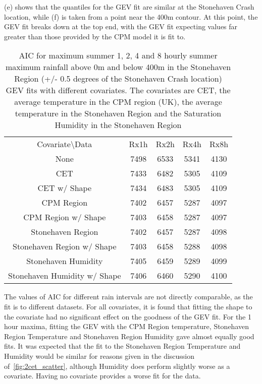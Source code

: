 (e) shows that the quantiles for the GEV fit are similar at the Stonehaven Crash location,
    while (f) is taken from a point near the 400m contour.
At this point, the GEV fit breaks down at the top end,
    with the GEV fit expecting values far greater than those provided by the CPM model it is fit to.

\begin{table}[H]
    \centering
    \begin{tabular}{c c c c c}
        Covariate\textbackslash Data & Rx1h & Rx2h & Rx4h & Rx8h \\
        None &7498&6533&5341&4130 \\
        CET &7433&6482&5305&4109 \\
        CET w/ Shape &7434&6483&5305&4109 \\
        CPM Region &7402&6457&5287&4097 \\
        CPM Region w/ Shape &7403&6458&5287&4097 \\
        Stonehaven Region &7402&6457&5287&4098 \\
        Stonehaven Region w/ Shape &7403&6458&5288&4098 \\
        Stonehaven Humidity &7405&6459&5289&4099 \\
        Stonehaven Humidity w/ Shape &7406&6460&5290&4100 \\
    \end{tabular}
    \caption{AIC for maximum summer 1, 2, 4 and 8 hourly summer maximum rainfall
        above 0m and below 400m in the Stonehaven Region (+/- 0.5 degrees of the Stonehaven Crash location)
        GEV fits with different covariates.
    The covariates are CET, the average temperature in the CPM region (UK),
    the average temperature in the Stonehaven Region and
    the Saturation Humidity in the Stonehaven Region}
    \label{tab:AICtable}
\end{table}

The values of AIC for different rain intervals are not directly comparable,
    as the fit is to different datasets.
For all covariates,
    it is found that fitting the shape to the covariate had no significant effect on the goodness of the GEV fit.
For the 1 hour maxima,
    fitting the GEV with the CPM Region temperature, Stonehaven Region Temperature and Stonehaven Region Humidity gave almost equally good fits.
It was expected that the fit to the Stonehaven Region Temperature and Humidity would be similar for
    reasons given in the discussion of~\ref{fig:2cet_scatter},
    although Humidity does perform slightly worse as a covariate.
Having no covariate provides a worse fit for the data.

